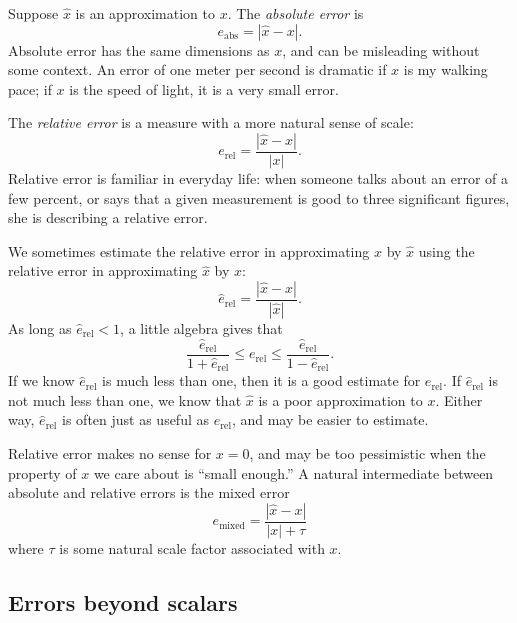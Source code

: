 \documentclass[12pt, leqno]{article} %
\begin{document}
Suppose $\hat{x}$ is an approximation to $x$.
The {\em absolute error} is
\[
  e_{\mathrm{abs}} = |\hat{x}-x|.
\]
Absolute error has the same dimensions as $x$,
and can be misleading without some context.  An error
of one meter per second is dramatic if $x$ is my walking
pace; if $x$ is the speed of light, it is a very small error.

The {\em relative error} is a measure with a more natural
sense of scale:
\[
  e_{\mathrm{rel}} = \frac{|\hat{x}-x|}{|x|}.
\]
Relative error is familiar in everyday life: when someone
talks about an error of a few percent, or says that a given
measurement is good to three significant figures, she is describing
a relative error.

We sometimes estimate the relative error in approximating
$x$ by $\hat{x}$ using the relative error in approximating
$\hat{x}$ by $x$:
\[
  \hat{e}_{\mathrm{rel}} = \frac{|\hat{x}-x|}{|\hat{x}|}.
\]
As long as $\hat{e}_{\mathrm{rel}} < 1$, a little algebra gives that
\[
  \frac{\hat{e}_{\mathrm{rel}}}{1+\hat{e}_{\mathrm{rel}}} \leq
  e_{\mathrm{rel}} \leq
  \frac{\hat{e}_{\mathrm{rel}}}{1-\hat{e}_{\mathrm{rel}}}.
\]
If we know $\hat{e}_{\mathrm{rel}}$ is much less than one, then it
is a good estimate for $e_{\mathrm{rel}}$.  If
$\hat{e}_{\mathrm{rel}}$ is not much less than one,
we know that $\hat{x}$ is a poor approximation to $x$.
Either way, $\hat{e}_{\mathrm{rel}}$ is often just as useful
as $e_{\mathrm{rel}}$, and may be easier to estimate.

Relative error makes no sense for $x = 0$, and may be too pessimistic
when the property of $x$ we care about is ``small enough.''  A natural
intermediate between absolute and relative errors is the mixed error
\[
  e_{\mathrm{mixed}} = \frac{|\hat{x}-x|}{|x| + \tau}
\]
where $\tau$ is some natural scale factor associated with $x$.

\subsection{Errors beyond scalars}
\end{document}
